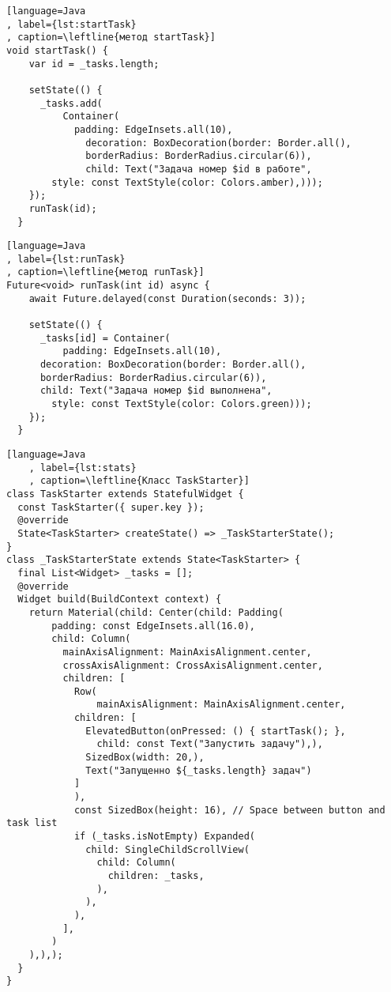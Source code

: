 \begin{lstlisting}[language=Java
, label={lst:startTask}
, caption=\leftline{метод startTask}]
void startTask() {
    var id = _tasks.length;

    setState(() {
      _tasks.add(
          Container(
            padding: EdgeInsets.all(10),
              decoration: BoxDecoration(border: Border.all(),
              borderRadius: BorderRadius.circular(6)),
              child: Text("Задача номер $id в работе",
        style: const TextStyle(color: Colors.amber),)));
    });
    runTask(id);
  }
\end{lstlisting}


\begin{lstlisting}[language=Java
, label={lst:runTask}
, caption=\leftline{метод runTask}]
Future<void> runTask(int id) async {
    await Future.delayed(const Duration(seconds: 3));

    setState(() {
      _tasks[id] = Container(
          padding: EdgeInsets.all(10),
      decoration: BoxDecoration(border: Border.all(),
      borderRadius: BorderRadius.circular(6)),
      child: Text("Задача номер $id выполнена",
        style: const TextStyle(color: Colors.green)));
    });
  }
\end{lstlisting}
\clearpage

\begin{lstlisting}[language=Java
	, label={lst:stats}
	, caption=\leftline{Класс TaskStarter}]
class TaskStarter extends StatefulWidget {
  const TaskStarter({ super.key });
  @override
  State<TaskStarter> createState() => _TaskStarterState();
}
class _TaskStarterState extends State<TaskStarter> {
  final List<Widget> _tasks = [];
  @override
  Widget build(BuildContext context) {
    return Material(child: Center(child: Padding(
        padding: const EdgeInsets.all(16.0),
        child: Column(
          mainAxisAlignment: MainAxisAlignment.center,
          crossAxisAlignment: CrossAxisAlignment.center,
          children: [
            Row(
                mainAxisAlignment: MainAxisAlignment.center,
            children: [
              ElevatedButton(onPressed: () { startTask(); },
                child: const Text("Запустить задачу"),),
              SizedBox(width: 20,),
              Text("Запущенно ${_tasks.length} задач")
            ]
            ),
            const SizedBox(height: 16), // Space between button and task list
            if (_tasks.isNotEmpty) Expanded(
              child: SingleChildScrollView(
                child: Column(
                  children: _tasks,
                ),
              ),
            ),
          ],
        )
    ),),);
  }
}
\end{lstlisting}

